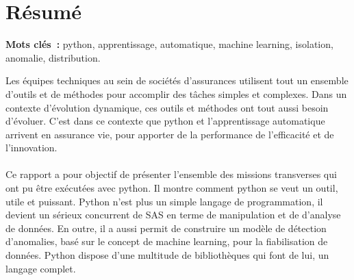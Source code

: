 \chapter*{Résumé} 

\begin{singlespace}
\textbf{Mots clés~:} python, apprentissage, automatique, machine learning, isolation, anomalie, distribution.
\end{singlespace}

Les équipes techniques au sein de sociétés d'assurances utilisent tout un ensemble d'outils et de méthodes pour accomplir des tâches simples et complexes. Dans un contexte d'évolution dynamique, ces outils et méthodes ont tout aussi besoin d'évoluer. C'est dans ce contexte que python et l'apprentissage automatique arrivent en assurance vie, pour apporter de la performance de l'efficacité et de l'innovation. 
\\
\\
Ce rapport a pour objectif de présenter l'ensemble des missions transverses qui ont pu être exécutées avec python. Il montre comment python se veut un outil, utile et puissant. Python n'est plus un simple langage de programmation, il devient un sérieux concurrent de SAS en terme de manipulation et de d'analyse de données. En outre, il a aussi permit de construire un modèle de détection d'anomalies, basé sur le concept de machine learning, pour la fiabilisation de données. Python dispose d'une multitude de bibliothèques qui font de lui, un langage complet.

